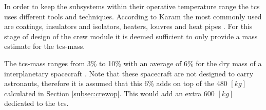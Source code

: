 In order to keep the subsystems within their operative temperature range the \gls{tcs} uses different tools and techniques. According to Karam the most commonly used are coatings, insulators and isolators, heaters, louvres and heat pipes \cite{Karam1998}. For this stage of design of the crew module it is deemed sufficient to only provide a mass estimate for the \gls{tcs}-mass.

The \gls{tcs}-mass ranges from 3\% to 10\% with an average of 6\% for the dry mass of a interplanetary spacecraft \cite[p.953]{Wertz2011}. Note that these spacecraft are not designed to carry astronauts, therefore it is assumed that this 6\% adds on top of the 480 $[kg]$ calculated in Section \ref{subsec:crewop}. This would add an extra 600 $[kg]$ dedicated to the \gls{tcs}.
